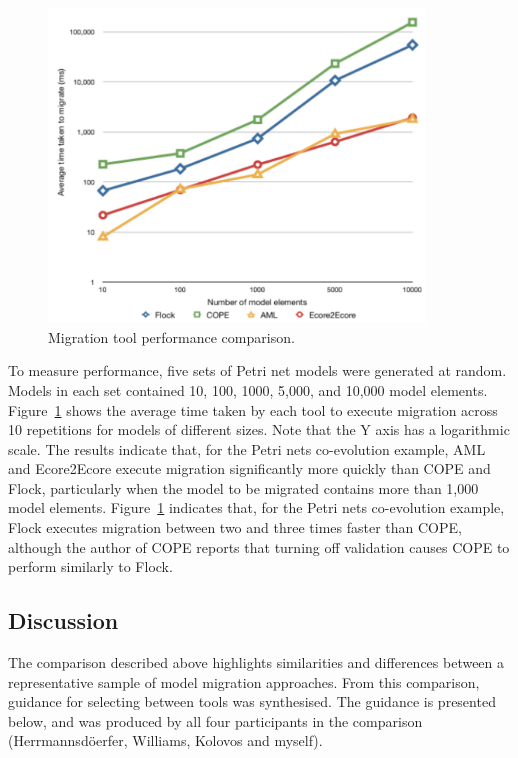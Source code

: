 \begin{figure}[htbp]
	\centering
	\includegraphics[width=10cm]{6.Evaluation/images/migration_tool_performance.pdf}
	\caption{Migration tool performance comparison.}
	\label{fig:performance}
\end{figure}

To measure performance, five sets of Petri net models were generated at random. Models in each set contained 10, 100, 1000, 5,000, and 10,000 model elements.  Figure~\ref{fig:performance} shows the average time taken by each tool to execute migration across 10 repetitions for models of different sizes. Note that the Y axis has a logarithmic scale. The results indicate that, for the Petri nets co-evolution example, AML and Ecore2Ecore execute migration significantly more quickly than COPE and Flock, particularly when the model to be migrated contains more than 1,000 model elements. Figure~\ref{fig:performance} indicates that, for the Petri nets co-evolution example, Flock executes migration between two and three times faster than COPE, although the author of COPE reports that turning off validation causes COPE to perform similarly to Flock.


\subsection{Discussion}
\label{sec:discussion}
The comparison described above highlights similarities and differences between a representative sample of model migration approaches. From this comparison, guidance for selecting between tools was synthesised. The guidance is presented below, and was produced by all four participants in the comparison (Herrmannsd\"{o}erfer, Williams, Kolovos and myself). 

